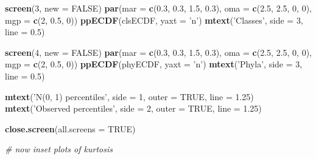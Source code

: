 \documentclass[]{article}
\newenvironment{Shaded}{\begin{snugshade}}{\end{snugshade}}
\newcommand{\KeywordTok}[1]{\textcolor[rgb]{0.13,0.29,0.53}{\textbf{#1}}}
\newcommand{\DataTypeTok}[1]{\textcolor[rgb]{0.13,0.29,0.53}{#1}}
\newcommand{\DecValTok}[1]{\textcolor[rgb]{0.00,0.00,0.81}{#1}}
\newcommand{\FloatTok}[1]{\textcolor[rgb]{0.00,0.00,0.81}{#1}}
\newcommand{\StringTok}[1]{\textcolor[rgb]{0.31,0.60,0.02}{#1}}
\newcommand{\CommentTok}[1]{\textcolor[rgb]{0.56,0.35,0.01}{\textit{#1}}}
\newcommand{\OtherTok}[1]{\textcolor[rgb]{0.56,0.35,0.01}{#1}}
\newcommand{\NormalTok}[1]{#1}
\begin{document}
\begin{Shaded}
\begin{Highlighting}[]
\KeywordTok{screen}\NormalTok{(}\DecValTok{3}\NormalTok{, }\DataTypeTok{new =} \OtherTok{FALSE}\NormalTok{)}
\KeywordTok{par}\NormalTok{(}\DataTypeTok{mar =} \KeywordTok{c}\NormalTok{(}\FloatTok{0.3}\NormalTok{, }\FloatTok{0.3}\NormalTok{, }\FloatTok{1.5}\NormalTok{, }\FloatTok{0.3}\NormalTok{), }\DataTypeTok{oma =} \KeywordTok{c}\NormalTok{(}\FloatTok{2.5}\NormalTok{, }\FloatTok{2.5}\NormalTok{, }\DecValTok{0}\NormalTok{, }\DecValTok{0}\NormalTok{), }
    \DataTypeTok{mgp =} \KeywordTok{c}\NormalTok{(}\DecValTok{2}\NormalTok{, }\FloatTok{0.5}\NormalTok{, }\DecValTok{0}\NormalTok{))}
\KeywordTok{ppECDF}\NormalTok{(clsECDF, }\DataTypeTok{yaxt =} \StringTok{'n'}\NormalTok{)}
\KeywordTok{mtext}\NormalTok{(}\StringTok{'Classes'}\NormalTok{, }\DataTypeTok{side =} \DecValTok{3}\NormalTok{, }\DataTypeTok{line =} \FloatTok{0.5}\NormalTok{)}

\KeywordTok{screen}\NormalTok{(}\DecValTok{4}\NormalTok{, }\DataTypeTok{new =} \OtherTok{FALSE}\NormalTok{)}
\KeywordTok{par}\NormalTok{(}\DataTypeTok{mar =} \KeywordTok{c}\NormalTok{(}\FloatTok{0.3}\NormalTok{, }\FloatTok{0.3}\NormalTok{, }\FloatTok{1.5}\NormalTok{, }\FloatTok{0.3}\NormalTok{), }\DataTypeTok{oma =} \KeywordTok{c}\NormalTok{(}\FloatTok{2.5}\NormalTok{, }\FloatTok{2.5}\NormalTok{, }\DecValTok{0}\NormalTok{, }\DecValTok{0}\NormalTok{), }
    \DataTypeTok{mgp =} \KeywordTok{c}\NormalTok{(}\DecValTok{2}\NormalTok{, }\FloatTok{0.5}\NormalTok{, }\DecValTok{0}\NormalTok{))}
\KeywordTok{ppECDF}\NormalTok{(phyECDF, }\DataTypeTok{yaxt =} \StringTok{'n'}\NormalTok{)}
\KeywordTok{mtext}\NormalTok{(}\StringTok{'Phyla'}\NormalTok{, }\DataTypeTok{side =} \DecValTok{3}\NormalTok{, }\DataTypeTok{line =} \FloatTok{0.5}\NormalTok{)}


\KeywordTok{mtext}\NormalTok{(}\StringTok{'N(0, 1) percentiles'}\NormalTok{, }\DataTypeTok{side =} \DecValTok{1}\NormalTok{, }\DataTypeTok{outer =} \OtherTok{TRUE}\NormalTok{, }\DataTypeTok{line =} \FloatTok{1.25}\NormalTok{)}
\KeywordTok{mtext}\NormalTok{(}\StringTok{'Observed percentiles'}\NormalTok{, }\DataTypeTok{side =} \DecValTok{2}\NormalTok{, }\DataTypeTok{outer =} \OtherTok{TRUE}\NormalTok{, }\DataTypeTok{line =} \FloatTok{1.25}\NormalTok{)}

\KeywordTok{close.screen}\NormalTok{(}\DataTypeTok{all.screens =} \OtherTok{TRUE}\NormalTok{)}


\CommentTok{# now inset plots of kurtosis}


\end{Highlighting}
\end{Shaded}
\end{document}
